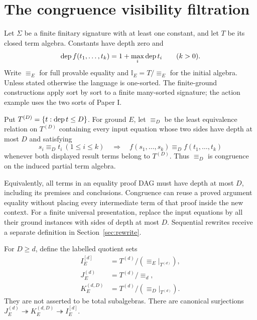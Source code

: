 \section{The congruence visibility filtration}\label{sec:filtration}

Let $\Sigma$ be a finite finitary signature with at least one constant,
and let $T$ be its closed term algebra. Constants have depth zero and
\[
\operatorname{dep} f(t_1,\ldots,t_k)=1+\max_i\operatorname{dep} t_i\qquad(k>0).
\]
Write $\equiv_E$ for full provable equality and
$\mathbb I_E=T/{\equiv_E}$ for the initial algebra.
Unless stated otherwise the language is one-sorted. The finite-ground
constructions apply sort by sort to a finite many-sorted signature; the
action example uses the two sorts of Paper I.

\begin{definition}
Put $T^{(D)}=\{t:\operatorname{dep} t\le D\}$. For ground $E$, let $\equiv_D$ be the
least equivalence relation on $T^{(D)}$ containing every input equation
whose two sides have depth at most $D$ and satisfying
\[
s_i\equiv_D t_i\ (1\le i\le k)
\quad\Longrightarrow\quad
f(s_1,\ldots,s_k)\equiv_D f(t_1,\ldots,t_k)
\]
whenever both displayed result terms belong to $T^{(D)}$.
Thus $\equiv_D$ is congruence on the induced partial term algebra.
\end{definition}

Equivalently, all terms in an equality proof DAG must have depth at most
$D$, including its premises and conclusions. Congruence can reuse a proved
argument equality without placing every intermediate term of that proof
inside the new context. For a finite universal presentation, replace the
input equations by all their ground instances with sides of depth at most
$D$. Sequential rewrites receive a separate definition in
Section~\ref{sec:rewrite}.

\begin{definition}
For $D\ge d$, define the labelled quotient sets
\begin{align*}
I_E^{[d]}&=T^{(d)}/({\equiv_E}|_{T^{(d)}}),\\
J_E^{(d)}&=T^{(d)}/\equiv_d,\\
K_E^{(d,D)}&=T^{(d)}/({\equiv_D}|_{T^{(d)}}).
\end{align*}
They are not asserted to be total subalgebras. There are canonical
surjections $J_E^{(d)}\twoheadrightarrow K_E^{(d,D)}
\twoheadrightarrow I_E^{[d]}$.
\end{definition}

